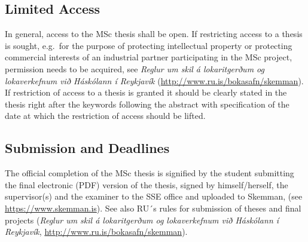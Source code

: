 \subsection{Limited Access}
In general, access to the MSc thesis shall be open.
If restricting access to a thesis is sought, e.g.\ for the purpose of protecting intellectual property or protecting commercial interests of an industrial partner participating in the MSc project, permission needs to be acquired, see {\em Reglur um skil á lokaritgerðum og lokaverkefnum við Háskólann í Reykjavík\/} (\url{http://www.ru.is/bokasafn/skemman}).
If restriction of access to a thesis is granted it should be clearly stated in the thesis right after the keywords following the abstract with specification of the date at which the restriction of access should be lifted.

\subsection{Submission and Deadlines}
The official completion of the MSc thesis is signified by the student submitting the final electronic (PDF) version of the thesis, signed by himself/herself, the supervisor(s) and the examiner to the SSE office and uploaded to Skemman, (see \url{https://www.skemman.is}).
See also RU´s rules for submission of theses and final projects ({\em Reglur um skil á lokaritgerðum og lokaverkefnum við Háskólann í Reykjavík\/}, \url{http://www.ru.is/bokasafn/skemman}).


